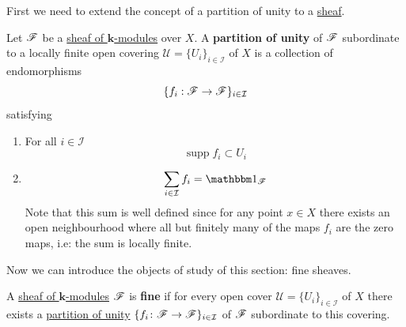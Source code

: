 \documentclass[../../main]{subfiles}
\begin{document}
First we need to extend the concept of a partition of unity to a \hyperref[def:sheaf]{sheaf}.
\begin{definition}\label{def:partition-of-unity}
  Let \(\mathscr{F}\) be a \hyperref[def:sheaf]{sheaf of \(\mathbf{k}\)-modules} over \(X\).
  A \textbf{partition of unity} of \(\mathscr{F}\) subordinate to a locally finite open covering \(\mathcal{U} = \{U_{i}\}_{i \in \mathcal{I}}\) of \(X\) is a collection of endomorphisms 
  \begin{equation*}
    \{ f_{i}: \mathscr{F} \to \mathscr{F} \}_{i \in \mathcal{I}}
  \end{equation*}
  satisfying
  \begin{enumerate}
    \item For all \(i \in \mathcal{I}\)
          \begin{equation*}
            \operatorname{supp} f_{i} \subset U_{i}
          \end{equation*}
    \item
          \begin{equation*}
            \sum_{i \in \mathcal{I}} f_{i} = \id_{\sheaf{F}}
          \end{equation*}
        Note that this sum is well defined since for any point \(x \in X\) there exists an open neighbourhood where all but finitely many of the maps \(f_{i}\) are the zero maps, i.e: the sum is locally finite.
  \end{enumerate}
\end{definition}

Now we can introduce the objects of study of this section: fine sheaves.
\begin{definition}\label{def:fine-sheaf}
  A \hyperref[def:sheaf]{sheaf of \(\mathbf{k}\)-modules} \(\mathscr{F}\) is \textbf{fine} if for every open cover \(\mathcal{U} = \{U_{i}\}_{i \in \mathcal{I}}\) of \(X\) there exists a \hyperref[def:partition-of-unity]{partition of unity} \(\{f_{i}\colon \mathscr{F} \to \mathscr{F}\}_{i \in \mathcal{I}}\) of \(\mathscr{F}\) subordinate to this covering.
\end{definition}
\end{document}
